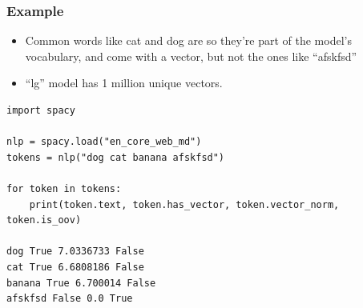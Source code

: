 \begin{frame}[fragile]\frametitle{Example}

\begin{itemize}
\item Common words like cat and dog are so they’re part of the model’s vocabulary, and come with a vector, but not the ones like ``afskfsd''
\item ``lg'' model has 1 million unique vectors.
\end{itemize}

\begin{lstlisting}
import spacy

nlp = spacy.load("en_core_web_md")
tokens = nlp("dog cat banana afskfsd")

for token in tokens:
    print(token.text, token.has_vector, token.vector_norm, token.is_oov)
		
dog True 7.0336733 False
cat True 6.6808186 False
banana True 6.700014 False
afskfsd False 0.0 True
\end{lstlisting}


\end{frame}

